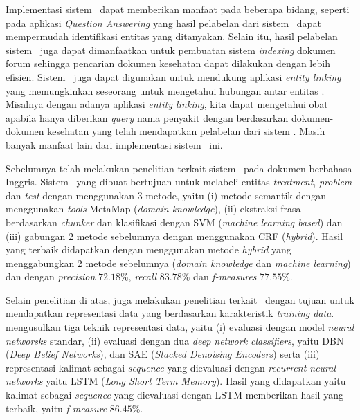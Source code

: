 Implementasi sistem \mer~dapat memberikan manfaat pada beberapa bidang, seperti pada aplikasi \textit{Question Answering} \citep{abacha2011medical} yang hasil pelabelan dari sistem \mer~dapat mempermudah identifikasi entitas yang ditanyakan. Selain itu, hasil pelabelan sistem \mer~juga dapat dimanfaatkan untuk pembuatan sistem \textit{indexing} dokumen forum sehingga pencarian dokumen kesehatan dapat dilakukan dengan lebih efisien. Sistem \mer~juga dapat digunakan untuk mendukung aplikasi \textit{entity linking} yang memungkinkan seseorang untuk mengetahui hubungan antar entitas \citep{hachey2013evaluating}. Misalnya dengan adanya aplikasi \textit{entity linking}, kita dapat mengetahui obat apabila hanya diberikan \textit{query} nama penyakit dengan berdasarkan dokumen-dokumen kesehatan yang telah mendapatkan pelabelan dari sistem \mer. Masih banyak manfaat lain dari implementasi sistem \mer~ini.

Sebelumnya \cite{abacha2011medical} telah melakukan penelitian terkait sistem \mer~pada dokumen berbahasa Inggris. Sistem \mer~yang dibuat bertujuan untuk melabeli entitas \textit{treatment}, \textit{problem} dan \textit{test} dengan menggunakan 3 metode, yaitu (i) metode semantik dengan menggunakan \textit{tools} MetaMap (\textit{domain knowledge}), (ii) ekstraksi frasa berdasarkan \textit{chunker} dan klasifikasi dengan SVM (\textit{machine learning based}) dan (iii) gabungan 2 metode sebelumnya dengan menggunakan CRF (\textit{hybrid}). Hasil yang terbaik didapatkan dengan menggunakan metode \textit{hybrid} yang menggabungkan 2 metode sebelumnya (\textit{domain knowledge} dan \textit{machine learning}) dan dengan \textit{precision} $ 72.18\% $, \textit{recall} $ 83.78\% $ dan \textit{f-measures} $ 77.55\% $.

Selain penelitian di atas, \cite{mujiono2016new} juga melakukan penelitian terkait \mer~dengan tujuan untuk mendapatkan representasi data yang berdasarkan karakteristik \textit{training data}. \cite{mujiono2016new} mengusulkan tiga teknik representasi data, yaitu (i) evaluasi dengan model \textit{neural networsks} standar, (ii) evaluasi dengan dua \textit{deep network classifiers}, yaitu DBN (\textit{Deep Belief Networks}), dan SAE (\textit{Stacked Denoising Encoders}) serta (iii) representasi kalimat sebagai \textit{sequence} yang dievaluasi dengan \textit{recurrent neural networks} yaitu LSTM (\textit{Long Short Term Memory}). Hasil yang didapatkan yaitu kalimat sebagai \textit{sequence} yang dievaluasi dengan LSTM memberikan hasil yang terbaik, yaitu \textit{f-measure} $ 86.45\% $.

